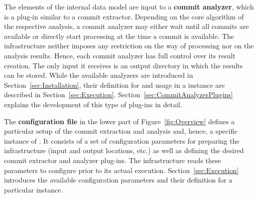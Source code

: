 The elements of the internal data model are input to a \textbf{commit analyzer}, which is a \thetool{} plug-in similar to a commit extractor. Depending on the core algorithm of the respective analysis, a commit analyzer may either wait until all commits are available or directly start processing at the time a commit is available. The infrastructure neither imposes any restriction on the way of processing nor on the analysis results. Hence, each commit analyzer has full control over its result creation. The only input it receives is an output directory in which the results can be stored. While the available analyzers are introduced in Section~\ref{sec:Installation}, their definition for and usage in a \thetool{} instance are described in Section~\ref{sec:Execution}. Section~\ref{sec:CommitAnalyzerPlugins} explains the development of this type of plug-ins in detail.

The \textbf{configuration file} in the lower part of Figure~\ref{fig:Overview} defines a particular setup of the commit extraction and analysis and, hence, a specific instance of \thetool{}. It consists of a set of configuration parameters for preparing the infrastructure (input and output locations, etc.) as well as defining the desired commit extractor and analyzer plug-ins. The infrastructure reads these parameters to configure \thetool{} prior to its actual execution. Section~\ref{sec:Execution} introduces the available configuration parameters and their definition for a particular \thetool{} instance.